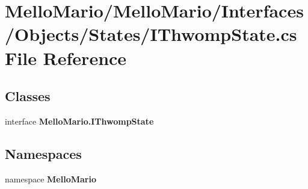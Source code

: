 \section{Mello\+Mario/\+Mello\+Mario/\+Interfaces/\+Objects/\+States/\+I\+Thwomp\+State.cs File Reference}
\label{IThwompState_8cs}
\subsection*{Classes}
\begin{DoxyCompactItemize}
\item 
interface \textbf{ Mello\+Mario.\+I\+Thwomp\+State}
\end{DoxyCompactItemize}
\subsection*{Namespaces}
\begin{DoxyCompactItemize}
\item 
namespace \textbf{ Mello\+Mario}
\end{DoxyCompactItemize}
